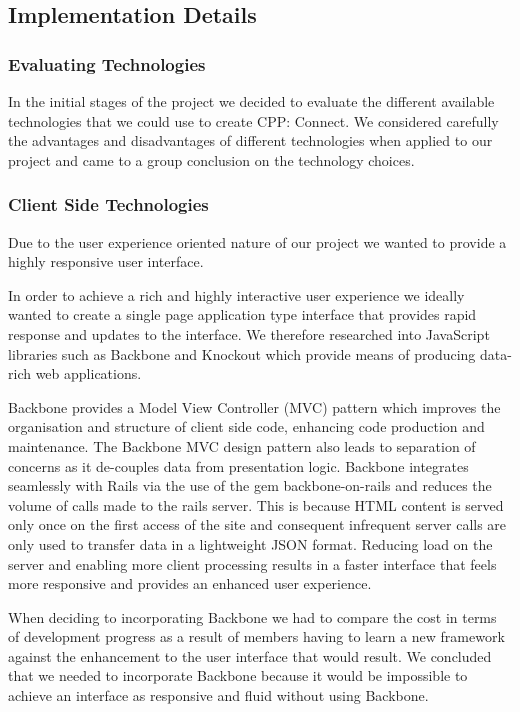 \subsection{Implementation Details}

	\subsubsection{Evaluating Technologies}
		In the initial stages of the project we decided to evaluate the different available technologies that we could use to create CPP: Connect. We considered carefully the advantages and disadvantages of different technologies when applied to our project and came to a group conclusion on the technology choices.

	\subsubsection{Client Side Technologies}
		Due to the user experience oriented nature of our project we wanted to provide a highly responsive user interface. 

		In order to achieve a rich and highly interactive user experience we ideally wanted to create a single page application type interface that provides rapid response and updates to the interface. We therefore researched into JavaScript libraries such as Backbone and Knockout which provide means of producing data-rich web applications.  
		
		Backbone provides a Model View Controller (MVC) pattern which improves the organisation and structure of client side code, enhancing code production and maintenance. The Backbone MVC design pattern also leads to separation of concerns as it de-couples data from presentation logic. Backbone integrates seamlessly with Rails via the use of the gem backbone-on-rails and reduces the volume of calls made to the rails server. This is because HTML content is served only once on the first access of the site and consequent infrequent server calls are only used to transfer data in a lightweight JSON format. Reducing load on the server and enabling more client processing results in a faster interface that feels more responsive and provides an enhanced user experience.
		
		When deciding to incorporating Backbone we had to compare the cost in terms of development progress as a result of members having to learn a new framework against the enhancement to the user interface that would result. We concluded that we needed to incorporate Backbone because it would be impossible to achieve an interface as responsive and fluid without using Backbone.

